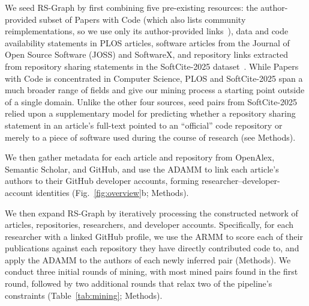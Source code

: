 \documentclass[pdflatex,sn-nature]{sn-jnl}%
\begin{document}
We seed RS-Graph by first combining five pre-existing resources: the author-provided subset of Papers with Code (which also lists community reimplementations, so we use only its author-provided links~\cite{farber2023linked,ciuciukiss2025study}), data and code availability statements in PLOS articles, software articles from the Journal of Open Source Software (JOSS) and SoftwareX, and repository links extracted from repository sharing statements in the SoftCite-2025 dataset~\cite{howison_2025_15149379}. While Papers with Code is concentrated in Computer Science, PLOS and SoftCite-2025 span a much broader range of fields and give our mining process a starting point outside of a single domain. Unlike the other four sources, seed pairs from SoftCite-2025 relied upon a supplementary model for predicting whether a repository sharing statement in an article's full-text pointed to an ``official'' code repository or merely to a piece of software used during the course of research (see Methods).

We then gather metadata for each article and repository from OpenAlex, Semantic Scholar, and GitHub, and use the ADAMM to link each article's authors to their GitHub developer accounts, forming researcher--developer-account identities (Fig.~\ref{fig:overview}b; Methods).

We then expand RS-Graph by iteratively processing the constructed network of articles, repositories, researchers, and developer accounts. Specifically, for each researcher with a linked GitHub profile, we use the ARMM to score each of their publications against each repository they have directly contributed code to, and apply the ADAMM to the authors of each newly inferred pair (Methods). We conduct three initial rounds of mining, with most mined pairs found in the first round, followed by two additional rounds that relax two of the pipeline's constraints (Table~\ref{tab:mining}; Methods).
\end{document}
